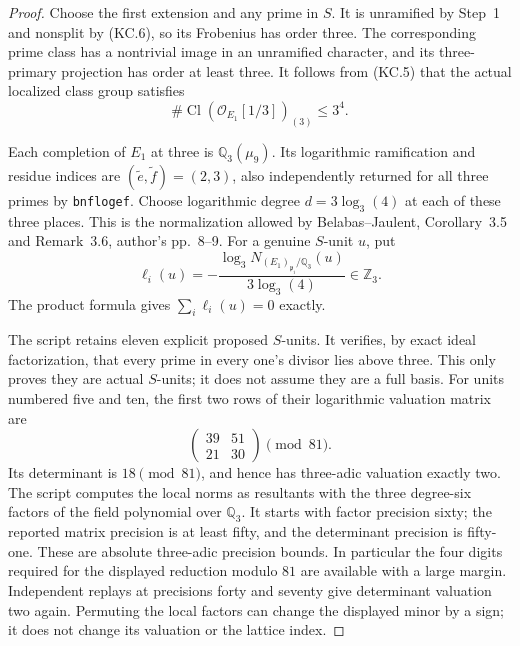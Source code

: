 \begin{proof}
Choose the first extension and any prime in $S$.
It is unramified by Step~1 and nonsplit by (KC.6), so its
Frobenius has order three.  The corresponding prime class
has a nontrivial image in an unramified character, and its
three-primary projection has order at least three.
It follows from (KC.5) that the actual localized class group
satisfies
\[
 \#\operatorname{Cl}(\mathcal O_{E_1}[1/3])_{(3)}
                         \leq3^4.                    \tag{KC.7}
\]

Each completion of $E_1$ at three is $\mathbb Q_3(\mu_9)$.
Its logarithmic ramification and residue indices are
$(\widetilde e,\widetilde f)=(2,3)$, also independently
returned for all three primes by \texttt{bnflogef}.
Choose logarithmic degree $d=3\log_3(4)$ at each of these
three places.  This is the normalization allowed by
Belabas--Jaulent, Corollary~3.5 and Remark~3.6, author's
pp.~8--9.  For a genuine $S$-unit $u$, put
\[
  \ell_i(u)=-\frac{\log_3 N_{(E_1)_{\mathfrak p_i}/\mathbb Q_3}(u)}
                         {3\log_3(4)}\in\mathbb Z_3.
\]
The product formula gives $\sum_i\ell_i(u)=0$ exactly.

The script  retains
eleven explicit proposed $S$-units.  It verifies, by exact
ideal factorization, that every prime in every one's divisor
lies above three.  This only proves they are actual $S$-units;
it does not assume they are a full basis.  For units numbered
five and ten, the first two rows of their logarithmic
valuation matrix are
\[
       \begin{pmatrix}39&51\\21&30\end{pmatrix}
                  \pmod{81}.                         \tag{KC.8}
\]
Its determinant is $18\pmod{81}$, and hence has three-adic
valuation exactly two.  The script computes the local norms
as resultants with the three degree-six factors of the field
polynomial over $\mathbb Q_3$.  It starts with factor precision
sixty; the reported matrix precision is at least fifty,
and the determinant precision is fifty-one.  These are
absolute three-adic precision bounds.  In particular the
four digits required for the displayed reduction modulo
$81$ are available with a large margin.  Independent
replays at precisions forty and seventy give determinant
valuation two again.  Permuting the local factors can
change the displayed minor by a sign; it does not change
its valuation or the lattice index.


\end{proof}
